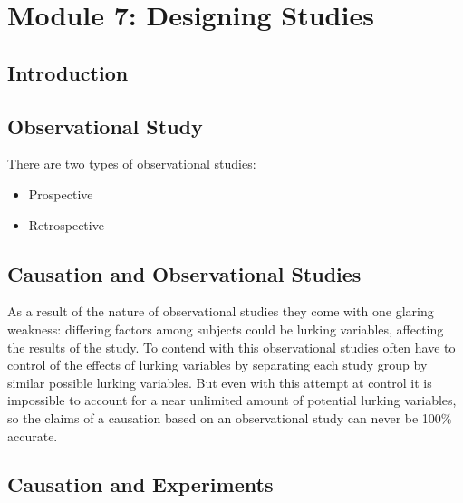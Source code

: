 \documentclass[12pt letter]{report}
\begin{document}
\chapter{Module 7: Designing Studies}


\section{Introduction}




\section{Observational Study}

There are two types of observational studies:
\begin{itemize}
	\item Prospective
	\item Retrospective
\end{itemize}

\section{Causation and Observational Studies}

As a result of the nature of observational studies they come with one glaring weakness: differing factors among subjects
could be lurking variables, affecting the results of the study. To contend with this observational studies often have to
control of the effects of lurking variables by separating each study group by similar possible lurking variables. But
even with this attempt at control it is impossible to account for a near unlimited amount of potential lurking
variables, so the claims of a causation based on an observational study can never be 100\% accurate.



\section{Causation and Experiments}
\end{document}
